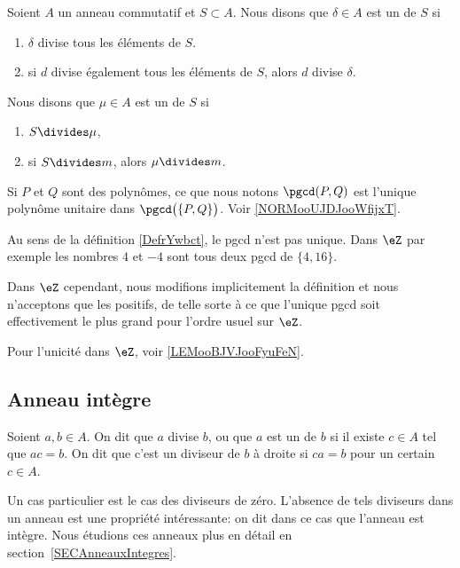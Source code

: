 \begin{definition}          \label{DefrYwbct}
	Soient \( A\) un anneau commutatif et \( S\subset A\). Nous disons que \( \delta\in A\) est un  de \( S\) si
	\begin{enumerate}
		\item
		      \( \delta\) divise tous les éléments de \( S\).
		\item       \label{ITEMooVCKGooWDXZOj}
		      si \( d\) divise également tous les éléments de \( S\), alors \( d\) divise \( \delta\).
	\end{enumerate}
	Nous disons que \( \mu\in A\) est un  de \( S\) si
	\begin{enumerate}
		\item
		      \( S\divides \mu\),
		\item
		      si \( S\divides m\), alors \( \mu\divides m\).
	\end{enumerate}
	Si \( P\) et \( Q\) sont des polynômes, ce que nous notons \( \pgcd(P,Q)\) est l'unique polynôme unitaire dans \( \pgcd\big( \{ P,Q \} \big)\). Voir \ref{NORMooUJDJooWfijxT}.
\end{definition}

\begin{remark}
	Au sens de la définition \ref{DefrYwbct}, le pgcd n'est pas unique. Dans \( \eZ\) par exemple les nombres \( 4\) et \( -4\) sont tous deux pgcd de \( \{4,16  \}\).

	Dans \( \eZ\) cependant, nous modifions implicitement la définition et nous n'acceptons que les positifs, de telle sorte à ce que l'unique pgcd soit effectivement le plus grand pour l'ordre usuel sur \( \eZ\).

	Pour l'unicité dans \( \eZ\), voir \ref{LEMooBJVJooFyuFeN}.
\end{remark}

\subsection{Anneau intègre}

\begin{definition}\label{DiviseursAnneau}
	Soient \( a, b \in A \). On dit que \( a\) divise \( b\), ou que \( a\) est un  de \( b\) si il existe \( c \in A \) tel que \( ac = b \). On dit que c'est un diviseur de \( b\) à droite si \( ca = b \) pour un certain \( c \in A \).
\end{definition}
Un cas particulier est le cas des diviseurs de zéro. L'absence de tels diviseurs dans un anneau est une propriété intéressante: on dit dans ce cas que l'anneau est intègre. Nous étudions ces anneaux plus en détail en section~\ref{SECAnneauxIntegres}.

